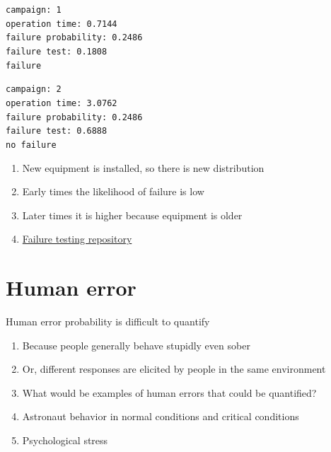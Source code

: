 \documentclass[aspectratio=1610,pdftex,dvipsnames,compress,xcolor={dvipsnames}]{beamer}
\begin{document}
\begin{frame}{}
    \texttt{campaign: 1\\
    operation time: 0.7144\\
    failure probability: 0.2486\\  
    failure test: 0.1808\\  
    failure}
    
    \vspace{0.10in}

    \texttt{campaign: 2\\
    operation time: 3.0762\\
    failure probability: 0.2486\\
    failure test: 0.6888\\
    no failure}

    \begin{enumerate}[series=outerlist,topsep=0pt,itemsep=5pt,leftmargin=*,label=(\arabic*)]
        \item[]New equipment is installed, so there is new distribution
        \item[]Early times the likelihood of failure is low 
        \item[]Later times it is higher because equipment is older
        \item[]\href{https://github.com/TheDoctorRAB/failure.testing}{Failure testing repository}
    \end{enumerate}
\end{frame}


\section{Human error}


\addtocounter{framenumber}{-1}
\begin{frame}{Human error probability is difficult to quantify}
    \begin{enumerate}[series=outerlist,topsep=0pt,itemsep=21pt,leftmargin=*,label=(\arabic*)]
        \item[]Because people generally behave stupidly even sober
        \item[]Or, different responses are elicited by people in the same environment
        \item[]What would be examples of human errors that could be quantified?
        \item[]Astronaut behavior in normal conditions and critical conditions
        \item[]Psychological stress
    \end{enumerate}
\end{frame}
\end{document}
